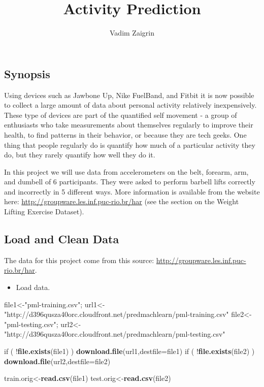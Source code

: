\documentclass[]{article}
\title{Activity Prediction}
\author{Vadim Zaigrin}
\date{}
\newenvironment{Shaded}{\begin{snugshade}}{\end{snugshade}}
\newcommand{\KeywordTok}[1]{\textcolor[rgb]{0.13,0.29,0.53}{\textbf{{#1}}}}
\newcommand{\DataTypeTok}[1]{\textcolor[rgb]{0.13,0.29,0.53}{{#1}}}
\newcommand{\StringTok}[1]{\textcolor[rgb]{0.31,0.60,0.02}{{#1}}}
\newcommand{\NormalTok}[1]{{#1}}
\begin{document}
\maketitle


\subsection{Synopsis}\label{synopsis}

Using devices such as Jawbone Up, Nike FuelBand, and Fitbit it is now
possible to collect a large amount of data about personal activity
relatively inexpensively. These type of devices are part of the
quantified self movement - a group of enthusiasts who take measurements
about themselves regularly to improve their health, to find patterns in
their behavior, or because they are tech geeks. One thing that people
regularly do is quantify how much of a particular activity they do, but
they rarely quantify how well they do it.

In this project we will use data from accelerometers on the belt,
forearm, arm, and dumbell of 6 participants. They were asked to perform
barbell lifts correctly and incorrectly in 5 different ways. More
information is available from the website here:
\url{http://groupware.les.inf.puc-rio.br/har} (see the section on the
Weight Lifting Exercise Dataset).

\subsection{Load and Clean Data}\label{load-and-clean-data}

The data for this project come from this source:
\url{http://groupware.les.inf.puc-rio.br/har}.

\begin{itemize}
\itemsep1pt\parskip0pt
\item
  Load data.
\end{itemize}

\begin{Shaded}
\begin{Highlighting}[]
\NormalTok{file1<-}\StringTok{"pml-training.csv"}\NormalTok{; url1<-}\StringTok{"http://d396qusza40orc.cloudfront.net/predmachlearn/pml-training.csv"}
\NormalTok{file2<-}\StringTok{"pml-testing.csv"}\NormalTok{; url2<-}\StringTok{"http://d396qusza40orc.cloudfront.net/predmachlearn/pml-testing.csv"}

\NormalTok{if ( !}\KeywordTok{file.exists}\NormalTok{(file1) )  }\KeywordTok{download.file}\NormalTok{(url1,}\DataTypeTok{destfile=}\NormalTok{file1)}
\NormalTok{if ( !}\KeywordTok{file.exists}\NormalTok{(file2) )  }\KeywordTok{download.file}\NormalTok{(url2,}\DataTypeTok{destfile=}\NormalTok{file2)}

\NormalTok{train.orig<-}\KeywordTok{read.csv}\NormalTok{(file1)}
\NormalTok{test.orig<-}\KeywordTok{read.csv}\NormalTok{(file2)}
\end{Highlighting}
\end{Shaded}
\end{document}
